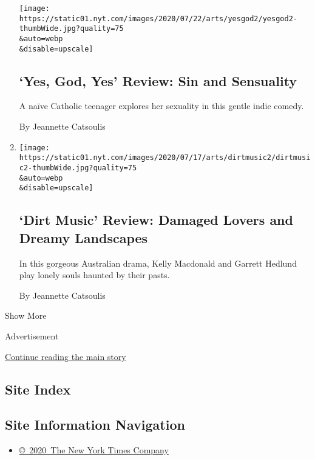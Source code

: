 \begin{enumerate}
  \texttt{[image: https://static01.nyt.com/images/2020/07/22/arts/yesgod2/yesgod2-thumbWide.jpg?quality=75\\\&auto=webp\\\&disable=upscale]}

  \hypertarget{yes-god-yes-review-sin-and-sensuality}{%
  \subsection{`Yes, God, Yes' Review: Sin and
  Sensuality}\label{yes-god-yes-review-sin-and-sensuality}}

  A naïve Catholic teenager explores her sexuality in this gentle indie
  comedy.

  By Jeannette Catsoulis
\item
  \href{/2020/07/16/movies/dirt-music-review.html}{}

  \texttt{[image: https://static01.nyt.com/images/2020/07/17/arts/dirtmusic2/dirtmusic2-thumbWide.jpg?quality=75\\\&auto=webp\\\&disable=upscale]}

  \hypertarget{dirt-music-review-damaged-lovers-and-dreamy-landscapes}{%
  \subsection{`Dirt Music' Review: Damaged Lovers and Dreamy
  Landscapes}\label{dirt-music-review-damaged-lovers-and-dreamy-landscapes}}

  In this gorgeous Australian drama, Kelly Macdonald and Garrett Hedlund
  play lonely souls haunted by their pasts.

  By Jeannette Catsoulis
\end{enumerate}

Show More

Advertisement

\protect\hyperlink{after-mid2}{Continue reading the main story}

\hypertarget{site-index}{%
\subsection{Site Index}\label{site-index}}

\hypertarget{site-information-navigation}{%
\subsection{Site Information
Navigation}\label{site-information-navigation}}

\begin{itemize}
\tightlist
\item
  \href{https://help.nytimes.com/hc/en-us/articles/115014792127-Copyright-notice}{©~2020~The
  New York Times Company}
\end{itemize}

